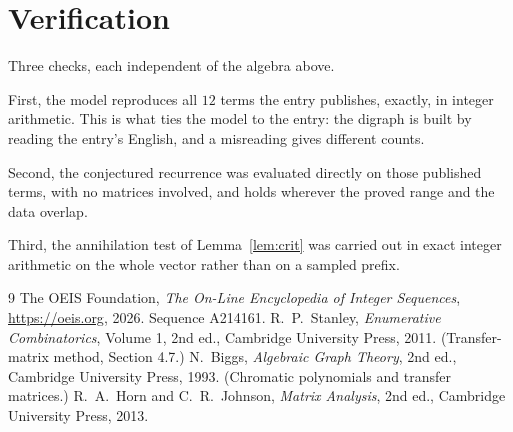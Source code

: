 \documentclass[11pt,a4paper]{article}
\theoremstyle{plain}
\theoremstyle{definition}
\begin{document}
\section{Verification}

Three checks, each independent of the algebra above.

First, the model reproduces all $12$ terms the entry publishes, exactly, in integer
arithmetic. This is what ties the model to the entry: the digraph is built by reading the
entry's English, and a misreading gives different counts.

Second, the conjectured recurrence was evaluated directly on those published terms, with no
matrices involved, and holds wherever the proved range and the data overlap.

Third, the annihilation test of Lemma~\ref{lem:crit} was carried out in exact integer
arithmetic on the whole vector rather than on a sampled prefix.

\begin{thebibliography}{9}
 The OEIS Foundation, \emph{The On-Line Encyclopedia of Integer
Sequences}, \url{https://oeis.org}, 2026. Sequence A214161.
 R.~P.~Stanley, \emph{Enumerative Combinatorics}, Volume 1, 2nd ed.,
Cambridge University Press, 2011. (Transfer-matrix method, Section 4.7.)
 N.~Biggs, \emph{Algebraic Graph Theory}, 2nd ed., Cambridge University
Press, 1993. (Chromatic polynomials and transfer matrices.)
 R.~A.~Horn and C.~R.~Johnson, \emph{Matrix Analysis}, 2nd ed., Cambridge
University Press, 2013.
\end{thebibliography}
\end{document}
